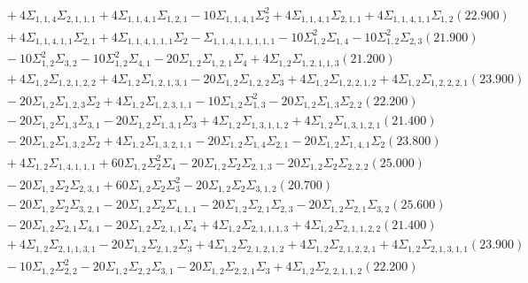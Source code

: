 \documentclass[12pt]{article}
\begin{document}
\begin{landscape}
\begin{align*}
		&\quad\quad +4\Sigma_{1,1,4}\Sigma_{2,1,1,1}+4\Sigma_{1,1,4,1}\Sigma_{1,2,1}-10\Sigma_{1,1,4,1}\Sigma_{2}^{2}+4\Sigma_{1,1,4,1}\Sigma_{2,1,1}+4\Sigma_{1,1,4,1,1}\Sigma_{1,2}(22.900) \\ 
		&\quad\quad +4\Sigma_{1,1,4,1,1}\Sigma_{2,1}+4\Sigma_{1,1,4,1,1,1}\Sigma_{2}-\Sigma_{1,1,4,1,1,1,1,1}-10\Sigma_{1,2}^{2}\Sigma_{1,4}-10\Sigma_{1,2}^{2}\Sigma_{2,3}(21.900) \\ 
		&\quad\quad -10\Sigma_{1,2}^{2}\Sigma_{3,2}-10\Sigma_{1,2}^{2}\Sigma_{4,1}-20\Sigma_{1,2}\Sigma_{1,2,1}\Sigma_{4}+4\Sigma_{1,2}\Sigma_{1,2,1,1,3}(21.200) \\ 
		&\quad\quad +4\Sigma_{1,2}\Sigma_{1,2,1,2,2}+4\Sigma_{1,2}\Sigma_{1,2,1,3,1}-20\Sigma_{1,2}\Sigma_{1,2,2}\Sigma_{3}+4\Sigma_{1,2}\Sigma_{1,2,2,1,2}+4\Sigma_{1,2}\Sigma_{1,2,2,2,1}(23.900) \\ 
		&\quad\quad -20\Sigma_{1,2}\Sigma_{1,2,3}\Sigma_{2}+4\Sigma_{1,2}\Sigma_{1,2,3,1,1}-10\Sigma_{1,2}\Sigma_{1,3}^{2}-20\Sigma_{1,2}\Sigma_{1,3}\Sigma_{2,2}(22.200) \\ 
		&\quad\quad -20\Sigma_{1,2}\Sigma_{1,3}\Sigma_{3,1}-20\Sigma_{1,2}\Sigma_{1,3,1}\Sigma_{3}+4\Sigma_{1,2}\Sigma_{1,3,1,1,2}+4\Sigma_{1,2}\Sigma_{1,3,1,2,1}(21.400) \\ 
		&\quad\quad -20\Sigma_{1,2}\Sigma_{1,3,2}\Sigma_{2}+4\Sigma_{1,2}\Sigma_{1,3,2,1,1}-20\Sigma_{1,2}\Sigma_{1,4}\Sigma_{2,1}-20\Sigma_{1,2}\Sigma_{1,4,1}\Sigma_{2}(23.800) \\ 
		&\quad\quad +4\Sigma_{1,2}\Sigma_{1,4,1,1,1}+60\Sigma_{1,2}\Sigma_{2}^{2}\Sigma_{4}-20\Sigma_{1,2}\Sigma_{2}\Sigma_{2,1,3}-20\Sigma_{1,2}\Sigma_{2}\Sigma_{2,2,2}(25.000) \\ 
		&\quad\quad -20\Sigma_{1,2}\Sigma_{2}\Sigma_{2,3,1}+60\Sigma_{1,2}\Sigma_{2}\Sigma_{3}^{2}-20\Sigma_{1,2}\Sigma_{2}\Sigma_{3,1,2}(20.700) \\ 
		&\quad\quad -20\Sigma_{1,2}\Sigma_{2}\Sigma_{3,2,1}-20\Sigma_{1,2}\Sigma_{2}\Sigma_{4,1,1}-20\Sigma_{1,2}\Sigma_{2,1}\Sigma_{2,3}-20\Sigma_{1,2}\Sigma_{2,1}\Sigma_{3,2}(25.600) \\ 
		&\quad\quad -20\Sigma_{1,2}\Sigma_{2,1}\Sigma_{4,1}-20\Sigma_{1,2}\Sigma_{2,1,1}\Sigma_{4}+4\Sigma_{1,2}\Sigma_{2,1,1,1,3}+4\Sigma_{1,2}\Sigma_{2,1,1,2,2}(21.400) \\ 
		&\quad\quad +4\Sigma_{1,2}\Sigma_{2,1,1,3,1}-20\Sigma_{1,2}\Sigma_{2,1,2}\Sigma_{3}+4\Sigma_{1,2}\Sigma_{2,1,2,1,2}+4\Sigma_{1,2}\Sigma_{2,1,2,2,1}+4\Sigma_{1,2}\Sigma_{2,1,3,1,1}(23.900) \\ 
		&\quad\quad -10\Sigma_{1,2}\Sigma_{2,2}^{2}-20\Sigma_{1,2}\Sigma_{2,2}\Sigma_{3,1}-20\Sigma_{1,2}\Sigma_{2,2,1}\Sigma_{3}+4\Sigma_{1,2}\Sigma_{2,2,1,1,2}(22.200) \\ 

\end{align*}
\end{landscape}
\end{document}
